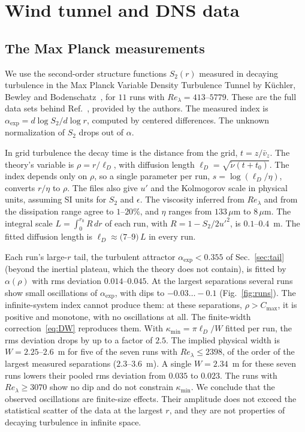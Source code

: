 \documentclass[floatfix,aps,pre,preprint,superscriptaddress,nofootinbib,amsmath,amssymb]{revtex4-2}
\begin{document}
\section{Wind tunnel and DNS data}\label{sec:data}

\subsection{The Max Planck measurements}

We use the second-order structure functions $S_2(r)$ measured in decaying turbulence in the Max Planck Variable Density
Turbulence Tunnel by Küchler, Bewley and Bodenschatz~\cite{GregXi2}, for $11$ runs with $Re_\lambda=413$--$5779$. These are the
full data sets behind Ref.~\cite{GregXi2}, provided by the authors. The measured index is
$\alpha_{\exp}=d\log S_2/d\log r$, computed by centered differences. The unknown normalization of $S_2$ drops out of $\alpha$.

In grid turbulence the decay time is the distance from the grid, $t=z/\bar v_z$. The theory's variable is
$\rho=r/\ell_D$, with diffusion length $\ell_D=\sqrt{\tilde\nu(t+t_0)}$. The index depends only on $\rho$, so a single parameter per run, $s=\log(\ell_D/\eta)$, converts $r/\eta$ to $\rho$.
The files also give $u'$ and the Kolmogorov scale in physical units, assuming SI units for $S_2$ and $\epsilon$. The
viscosity inferred from $Re_\lambda$ and from the dissipation range agree to $1$--$20\%$, and $\eta$ ranges from $133\,\mu$m to
$8\,\mu$m. The integral scale $L=\int_0^{r_0}R\,dr$ of each run, with $R=1-S_2/2u'^2$, is $0.1$--$0.4$~m. The fitted diffusion
length is $\ell_D\approx(7$--$9)\,L$ in every run.

Each run's large-$r$ tail, the turbulent attractor $\alpha_{\exp}<0.355$ of Sec.~\ref{sec:tail} (beyond the inertial plateau, which the theory does not contain), is fitted by
$\alpha(\rho)$ with rms deviation $0.014$--$0.045$. At the largest separations several runs show small oscillations of
$\alpha_{\exp}$, with dips to $-0.03\ldots-0.1$ (Fig.~\ref{fig:runs}). The infinite-system index cannot produce them: at these
separations, $\rho>C_{\max}$, it is positive and monotone, with no oscillations at all. The finite-width correction~\eqref{eq:DW}
reproduces them. With $\kappa_{\min}=\pi\ell_D/W$ fitted per run, the rms deviation drops by up to a factor of $2.5$. The
implied physical width is $W=2.25$--$2.6$~m for five of the seven runs with $Re_\lambda\le2398$, of the order of the largest
measured separations ($2.3$--$3.6$~m). A single $W=2.34$~m for these seven runs lowers their pooled rms deviation from $0.035$
to $0.023$. The runs with $Re_\lambda\ge3070$ show no dip and do not
constrain $\kappa_{\min}$. We conclude that the observed oscillations are finite-size effects. Their amplitude does not exceed the statistical scatter of
the data at the largest $r$, and they are not properties of decaying turbulence in infinite space.
\end{document}
